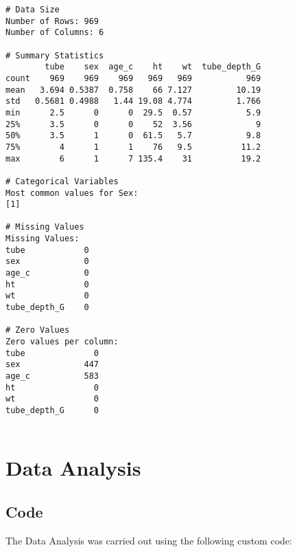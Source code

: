 \documentclass[11pt]{article}
\begin{document}
\begin{Verbatim}[tabsize=4]
# Data Size
Number of Rows: 969
Number of Columns: 6

# Summary Statistics
        tube    sex  age_c    ht    wt  tube_depth_G
count    969    969    969   969   969           969
mean   3.694 0.5387  0.758    66 7.127         10.19
std   0.5681 0.4988   1.44 19.08 4.774         1.766
min      2.5      0      0  29.5  0.57           5.9
25%      3.5      0      0    52  3.56             9
50%      3.5      1      0  61.5   5.7           9.8
75%        4      1      1    76   9.5          11.2
max        6      1      7 135.4    31          19.2

# Categorical Variables
Most common values for Sex:
[1]

# Missing Values
Missing Values:
tube            0
sex             0
age_c           0
ht              0
wt              0
tube_depth_G    0

# Zero Values
Zero values per column:
tube              0
sex             447
age_c           583
ht                0
wt                0
tube_depth_G      0


\end{Verbatim}

\section{Data Analysis}
\subsection{{Code}}
The Data Analysis was carried out using the following custom code:
\end{document}
